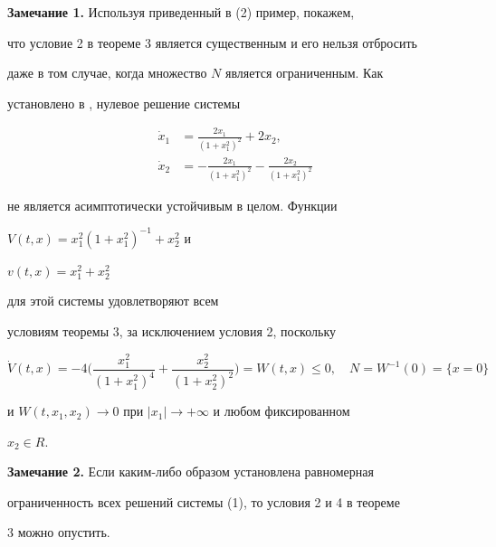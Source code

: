 \medskip


 




{\bf Замечание 1.} Используя приведенный в (2) пример, покажем, 


что условие 2 в теореме 3 является существенным и его нельзя отбросить 


даже в том случае, когда множество $N$ является ограниченным. Как 


установлено в \cite{Bar}, нулевое решение системы 


\begin{align*} 


\Dot x_1 &=\frac{2x_1}{(1+x{}^2_1)^2}+2x_2,\\ 


\Dot x_2 &=-\frac{2x_1}{(1+x{}^2_1)^2}-\frac{2x_2}{(1+x{}^2_1)^2} 


\end{align*} 


не является асимптотически устойчивым в целом. Функции 


$V(t,x)=x{}^2_1(1+x{}^2_1)^{-1}+x{}^2_2$ и 


$v(t,x)=x{}^2_1+x{}^2_2$ 


для этой системы удовлетворяют всем 


условиям теоремы 3, за исключением условия 2, поскольку 


$$ 


\Dot V(t,x)=-4\biggl(\frac{x{}^2_1}{(1+x{}^2_1)^4}+ 


\frac{x{}^2_2}{(1+x{}^2_2)^2}\biggr) 


=W(t,x)\le 0,\quad 


N=W^{-1}(0)=\{x=0\} 


$$ 


и $W(t,x_1,x_2)\to 0$ при $|x_1|\to+\infty$ и любом фиксированном 


$x_2\in R$. 


\bigskip 







{\bf Замечание 2.} Если каким-либо образом установлена равномерная 


ограниченность всех решений системы (1), то условия 2 и 4 в теореме 


3 можно опустить. 


\bigskip


 



